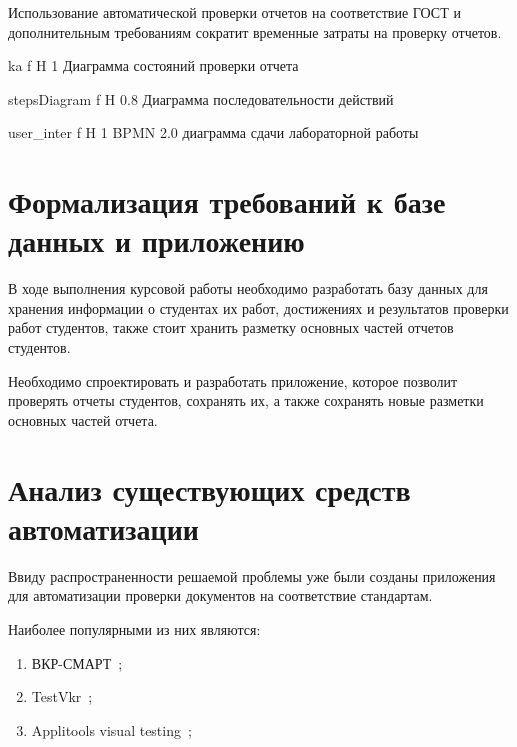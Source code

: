 Использование автоматической проверки отчетов на соответствие ГОСТ и дополнительным требованиям сократит временные затраты на проверку отчетов.


{ka} %
{f} %
{H} %
{1\textwidth} %
{Диаграмма состояний проверки отчета} %

{stepsDiagram} %
{f} %
{H} %
{0.8\textwidth} %
{Диаграмма последовательности действий} %

{user_inter} %
{f} %
{H} %
{1\textwidth} %
{BPMN 2.0 диаграмма сдачи лабораторной работы} %


\section{Формализация требований к базе данных и приложению}
В ходе выполнения курсовой работы необходимо разработать базу данных для хранения информации о студентах их работ, достижениях и результатов проверки работ студентов, также стоит хранить разметку основных частей отчетов студентов.

Необходимо спроектировать и разработать приложение, которое позволит проверять отчеты студентов, сохранять их, а также сохранять новые разметки основных частей отчета.


\section{Анализ существующих средств автоматизации}
Ввиду распространенности решаемой проблемы уже были созданы приложения для автоматизации проверки документов на соответствие стандартам.

Наиболее популярными из них являются:
\begin{enumerate}
	\item ВКР-СМАРТ~\cite{VKR_VYZ};
	\item TestVkr~\cite{TestVkr};
	\item Applitools visual testing~\cite{PdfTest};
\end{enumerate}

